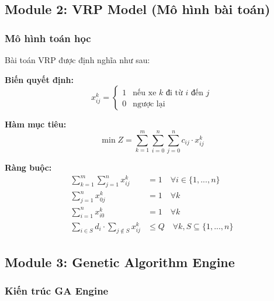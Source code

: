 \documentclass[12pt,a4paper]{article}
\begin{document}
\subsection{Module 2: VRP Model (Mô hình bài toán)}

\subsubsection{Mô hình toán học}

Bài toán VRP được định nghĩa như sau:

\textbf{Biến quyết định:}
\begin{equation}
x_{ij}^k = \begin{cases}
1 & \text{nếu xe } k \text{ đi từ } i \text{ đến } j \\
0 & \text{ngược lại}
\end{cases}
\end{equation}

\textbf{Hàm mục tiêu:}
\begin{equation}
\min Z = \sum_{k=1}^{m} \sum_{i=0}^{n} \sum_{j=0}^{n} c_{ij} \cdot x_{ij}^k
\end{equation}

\textbf{Ràng buộc:}
\begin{align}
\sum_{k=1}^{m} \sum_{j=1}^{n} x_{ij}^k &= 1 \quad \forall i \in \{1,...,n\} \tag{Mỗi khách được phục vụ 1 lần}\\
\sum_{j=1}^{n} x_{0j}^k &= 1 \quad \forall k \tag{Mỗi xe xuất phát từ depot}\\
\sum_{i=1}^{n} x_{i0}^k &= 1 \quad \forall k \tag{Mỗi xe trở về depot}\\
\sum_{i \in S} d_i \cdot \sum_{j \notin S} x_{ij}^k &\leq Q \quad \forall k, S \subseteq \{1,...,n\} \tag{Ràng buộc sức chứa}
\end{align}

\subsection{Module 3: Genetic Algorithm Engine}

\subsubsection{Kiến trúc GA Engine}
\end{document}
